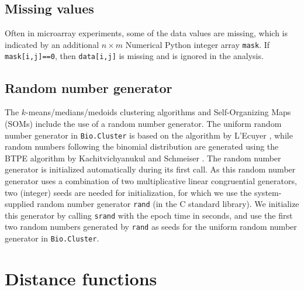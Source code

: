 \documentclass{report}
\begin{document}
\subsection*{Missing values}

Often in microarray experiments, some of the data values are missing, which is indicated by an additional $n \times m$ Numerical Python integer array \verb|mask|. If \verb|mask[i,j]==0|, then \verb|data[i,j]| is missing and is ignored in the analysis.

\subsection*{Random number generator}

The $k$-means/medians/medoids clustering algorithms and Self-Organizing Maps (SOMs) include the use of a random number generator. The uniform random number generator in \verb|Bio.Cluster| is based on the algorithm by L'Ecuyer \cite{lecuyer1988}, while random numbers following the binomial distribution are generated using the BTPE algorithm by Kachitvichyanukul and Schmeiser \cite{kachitvichyanukul1988}. The random number generator is initialized automatically during its first call. As this random number generator uses a combination of two multiplicative linear congruential generators, two (integer) seeds are needed for initialization, for which we use the system-supplied random number generator \verb|rand| (in the C standard library). We initialize this generator by calling \verb|srand| with the epoch time in seconds, and use the first two random numbers generated by \verb|rand| as seeds for the uniform random number generator in \verb|Bio.Cluster|.

\section{Distance functions}
\label{sec:distancefunctions}
\end{document}
